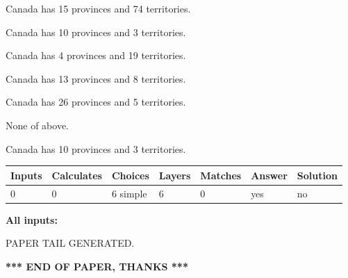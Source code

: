 \documentclass[12pt]{article}
\begin{document}
 
Canada has  15 provinces and  74 territories.
 
 
Canada has 10  provinces and 3 territories.
 
 
Canada has   4 provinces and  19 territories.
 
 
Canada has  13 provinces and  8 territories.
 
 
Canada has  26 provinces and  5 territories.
 
 
 None of above.
 
 
\noindent{}
 
 
Canada has 10  provinces and 3 territories.
 
 
\noindent{}
 
 
   
   
   
   
\noindent\begin{tabular}{|l|l|l|l|l|l|l|}
 \hline
Inputs & Calculates & Choices & Layers & Matches & Answer & Solution \\ \hline
 0  & 
 0  & 
 6
  simple  
  & 
 6  & 
 0  & 
  yes & 
  no 
  \\ \hline
 \end{tabular}
   
   
   
   
\noindent{}
   
   
   
   
\noindent\vspace{0.1in}\hspace{-0.08in} {\textbf{\Large{All inputs: }}}
   
   
   
   
   
   
 \vspace{0.2in}
 
   
   
\vspace{2.0in} PAPER TAIL GENERATED.
   
   
   
   
\vspace{1.0in} 
{\textbf{\large{ *** END OF PAPER, THANKS *** }}} 
   
\end{document}
